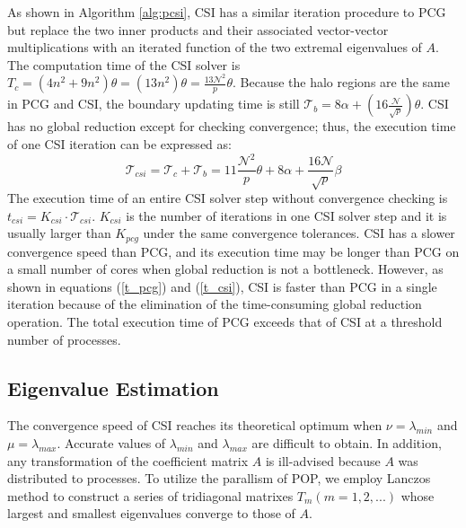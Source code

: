 \documentclass{sig-alternate}
\begin{document}
As shown in Algorithm \ref{alg:pcsi}, CSI has a similar iteration procedure to PCG but replace the two inner products and their associated vector-vector multiplications with an iterated function of the two extremal eigenvalues of $A$. The computation time of the CSI solver is $T_c =  (4 n^2 + 9n^2)\theta = (13n^2)\theta =\frac{13\mathcal{N}^2}{p}\theta$. Because the halo regions are the same in PCG and CSI, the boundary updating time is still $\mathcal{T}_b =8\alpha + (16 \frac{\mathcal{N}}{\sqrt{p}})\theta$. CSI has no global reduction except for checking convergence; thus, the execution time of one CSI iteration can be expressed as:
\begin{equation}
\label{t_csi}
\mathcal{T}_{csi} = \mathcal{T}_c + \mathcal{T}_b
= 11\frac{\mathcal{N}^2}{p}\theta+ 8\alpha + \frac{16\mathcal{N}}{ \sqrt{p}}\beta
\end{equation}
The execution time of an entire CSI solver step without convergence checking is $t_{csi} = K_{csi}\cdot \mathcal{T}_{csi}$. $K_{csi}$ is the number of iterations in one CSI solver step and it is usually larger than $K_{pcg}$ under the same convergence tolerances.  CSI has a slower convergence speed than PCG, and its execution time may be longer than PCG on a small number of cores when global reduction is not a bottleneck. However, as shown in equations (\ref{t_pcg}) and (\ref{t_csi}), CSI is faster than PCG in a single iteration because of the elimination of the time-consuming global reduction operation.
The total execution time of PCG exceeds that of CSI at a threshold number of processes.

\subsection{Eigenvalue Estimation}
The convergence speed of CSI reaches its theoretical optimum when $\nu = \lambda_{min}$ and $\mu =\lambda_{max}$. Accurate values of $\lambda_{min}$ and $\lambda_{max}$ are difficult to obtain. In addition, any transformation of the coefficient matrix $A$ is ill-advised because $A$ was distributed to processes.
To utilize the parallism of POP, we employ Lanczos method \cite{Paige1980235} to construct a series of tridiagonal matrixes $T_m (m=1,2,...)$ whose largest and smallest eigenvalues converge to those of $A$.
\end{document}

